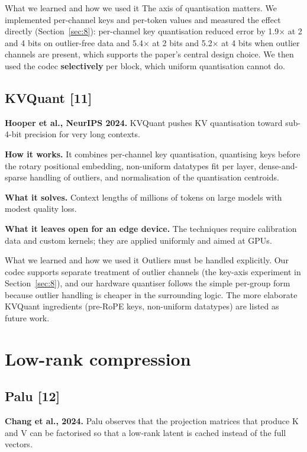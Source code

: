 \documentclass[12pt,a4paper]{report}
\begin{document}
\begin{calloutbox}{What we learned and how we used it}
The axis of quantisation matters. We implemented per-channel keys and per-token values and measured the effect directly (Section~\ref{sec:8}): per-channel key quantisation reduced error by 1.9× at 2 and 4 bits on outlier-free data and 5.4× at 2 bits and 5.2× at 4 bits when outlier channels are present, which supports the paper's central design choice. We then used the codec \textbf{selectively} per block, which uniform quantisation cannot do.

\end{calloutbox}
\subsection{KVQuant [11]}
\textbf{Hooper et al., NeurIPS 2024.} KVQuant pushes KV quantisation toward sub-4-bit precision for very long contexts.

\textbf{How it works.} It combines per-channel key quantisation, quantising keys before the rotary positional embedding, non-uniform datatypes fit per layer, dense-and-sparse handling of outliers, and normalisation of the quantisation centroids.

\textbf{What it solves.} Context lengths of millions of tokens on large models with modest quality loss.

\textbf{What it leaves open for an edge device.} The techniques require calibration data and custom kernels; they are applied uniformly and aimed at GPUs.

\begin{calloutbox}{What we learned and how we used it}
Outliers must be handled explicitly. Our codec supports separate treatment of outlier channels (the key-axis experiment in Section~\ref{sec:8}), and our hardware quantiser follows the simple per-group form because outlier handling is cheaper in the surrounding logic. The more elaborate KVQuant ingredients (pre-RoPE keys, non-uniform datatypes) are listed as future work.

\end{calloutbox}
\section{Low-rank compression}\label{sec:2_7}
\subsection{Palu [12]}
\textbf{Chang et al., 2024.} Palu observes that the projection matrices that produce K and V can be factorised so that a low-rank latent is cached instead of the full vectors.
\end{document}
